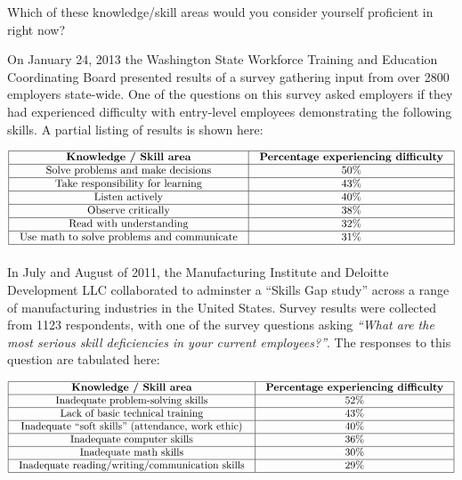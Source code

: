 Which of these knowledge/skill areas would you consider yourself proficient in right now?

\vskip 10pt

\filbreak

On January 24, 2013 the Washington State Workforce Training and Education Coordinating Board presented results of a survey gathering input from over 2800 employers state-wide.  One of the questions on this survey asked employers if they had experienced difficulty with entry-level employees demonstrating the following skills.  A partial listing of results is shown here:


$$\vbox{\offinterlineskip
\halign{\strut
\vrule \quad\hfil # \ \hfil & 
\vrule \quad\hfil # \ \hfil \vrule \cr
\noalign{\hrule}
%
{\bf Knowledge / Skill area} & {\bf Percentage experiencing difficulty} \cr
%
\noalign{\hrule}
%
Solve problems and make decisions & 50\% \cr
%
\noalign{\hrule}
%
Take responsibility for learning & 43\% \cr
%
\noalign{\hrule}
%
Listen actively & 40\% \cr
%
\noalign{\hrule}
%
Observe critically & 38\% \cr
%
\noalign{\hrule}
%
Read with understanding & 32\% \cr
%
\noalign{\hrule}
%
Use math to solve problems and communicate & 31\% \cr
%
\noalign{\hrule}
} %
}$$ %

\vskip 10pt

\filbreak

In July and August of 2011, the Manufacturing Institute and Deloitte Development LLC collaborated to adminster a ``Skills Gap study'' across a range of manufacturing industries in the United States.  Survey results were collected from 1123 respondents, with one of the survey questions asking {\it ``What are the most serious skill deficiencies in your current employees?''}.  The responses to this question are tabulated here:


$$\vbox{\offinterlineskip
\halign{\strut
\vrule \quad\hfil # \ \hfil & 
\vrule \quad\hfil # \ \hfil \vrule \cr
\noalign{\hrule}
%
{\bf Knowledge / Skill area} & {\bf Percentage experiencing difficulty} \cr
%
\noalign{\hrule}
%
Inadequate problem-solving skills & 52\% \cr
%
\noalign{\hrule}
%
Lack of basic technical training & 43\% \cr
%
\noalign{\hrule}
%
Inadequate ``soft skills'' (attendance, work ethic) & 40\% \cr
%
\noalign{\hrule}
%
Inadequate computer skills & 36\% \cr
%
\noalign{\hrule}
%
Inadequate math skills & 30\% \cr
%
\noalign{\hrule}
%
Inadequate reading/writing/communication skills & 29\% \cr
%
\noalign{\hrule}
} %
}$$ %

